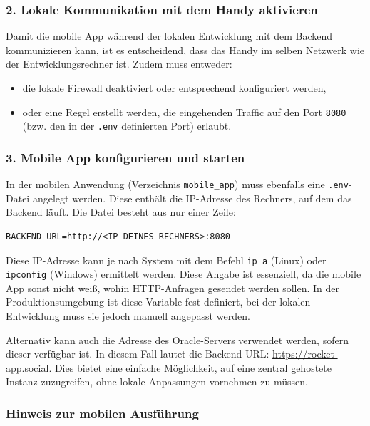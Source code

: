 \documentclass[11pt,a4paper]{article}
\begin{document}
\subsubsection{2. Lokale Kommunikation mit dem Handy aktivieren}

Damit die mobile App während der lokalen Entwicklung mit dem Backend kommunizieren kann, ist es entscheidend, dass das Handy im selben Netzwerk wie der Entwicklungsrechner ist. Zudem muss entweder:

\begin{itemize}
    \item die lokale Firewall deaktiviert oder entsprechend konfiguriert werden,
    \item oder eine Regel erstellt werden, die eingehenden Traffic auf den Port \texttt{8080} (bzw. den in der \texttt{.env} definierten Port) erlaubt.
\end{itemize}

\subsubsection{3. Mobile App konfigurieren und starten}

In der mobilen Anwendung (Verzeichnis \texttt{mobile\_app}) muss ebenfalls eine \texttt{.env}-Datei angelegt werden. Diese enthält die IP-Adresse des Rechners, auf dem das Backend läuft. Die Datei besteht aus nur einer Zeile:

\begin{verbatim}
BACKEND_URL=http://<IP_DEINES_RECHNERS>:8080
\end{verbatim}

Diese IP-Adresse kann je nach System mit dem Befehl \texttt{ip a} (Linux) oder \texttt{ipconfig} (Windows) ermittelt werden. Diese Angabe ist essenziell, da die mobile App sonst nicht weiß, wohin HTTP-Anfragen gesendet werden sollen. In der Produktionsumgebung ist diese Variable fest definiert, bei der lokalen Entwicklung muss sie jedoch manuell angepasst werden.

Alternativ kann auch die Adresse des Oracle-Servers verwendet werden, sofern dieser verfügbar ist. In diesem Fall lautet die Backend-URL: \url{https://rocket-app.social}. Dies bietet eine einfache Möglichkeit, auf eine zentral gehostete Instanz zuzugreifen, ohne lokale Anpassungen vornehmen zu müssen.

\subsubsection{Hinweis zur mobilen Ausführung}
\end{document}
